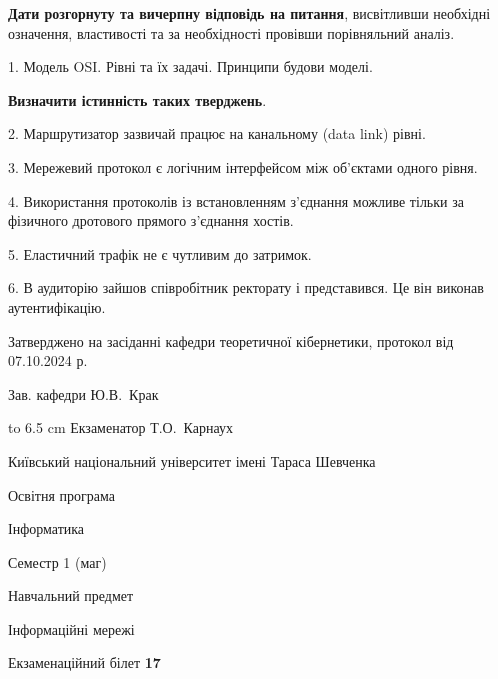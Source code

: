 \documentclass[12pt, ukrainian]{article}
\begin{document}
{
\qquad\textbf{Дати розгорнуту та вичерпну відповідь на питання}, висвітливши необхідні означення, властивості та за необхідності провівши порівняльний аналіз.

1. Модель OSI. Рівні та їх задачі. Принципи будови моделі.



\qquad\textbf{Визначити істинність таких тверджень}.

2. Маршрутизатор зазвичай працює на канальному (data link) рівні.


3. Мережевий протокол є логічним інтерфейсом між об'єктами одного рівня.


4. Використання протоколів із встановленням з'єднання можливе тільки за фізичного дротового прямого з'єднання хостів.


5. Еластичний трафік не є чутливим до затримок.


6. В аудиторію зайшов співробітник ректорату і представився. Це він виконав аутентифікацію.

}
{\smallskip\smallskip \begin {scriptsize} Затверджено на засіданні кафедри теоретичної кібернетики, протокол   від   07.10.2024 р.\par\smallskip\smallskip\smallskip\smallskip
{\parbox {6.5 cm} {Зав. кафедри \dotfill Ю.В.~Крак}}\hspace {0.7cm} {\hbox to 6.5 cm { Екзаменатор \dotfill Т.О.~Карнаух}} \end{scriptsize}}
\vspace{0.9cm}
{{\begin {scriptsize}\par
{ \center  Київський національний університет імені Тараса Шевченка \par}
{\parbox {5 cm}{Освітня програма \hfill}{\parbox {7 cm}{Інформатика\hfill}}\parbox {6 cm}{\hfill Семестр 1 (маг)}}\par
{\parbox {5 cm} {Навчальний предмет \hfill}\parbox {7 cm}{Інформаційні мережі \hfill}\parbox {6cm}{\hfill}\par}\vspace{-15pt} \end{scriptsize}}{\center Екзаменаційний білет \No \textbf { 17 }\par}}
\end{document}
